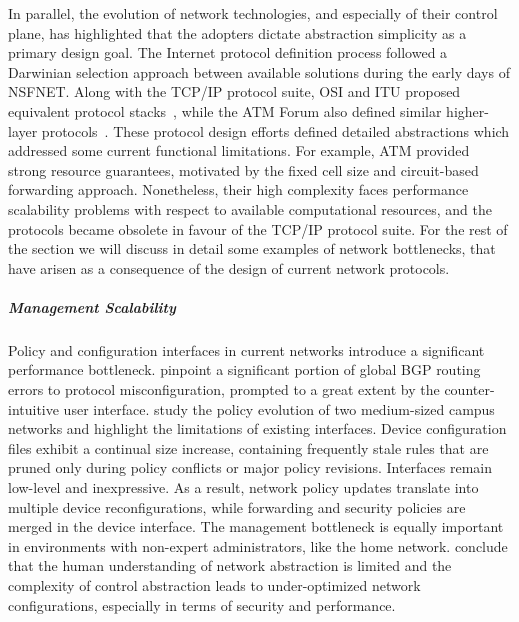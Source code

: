 In parallel, the evolution of network technologies, and especially of their
control plane, has highlighted that the adopters dictate abstraction
simplicity as a primary design goal. The Internet protocol definition process
followed a Darwinian selection approach between available solutions during the
early days of NSFNET\@. Along with the TCP/IP protocol suite, OSI and ITU
proposed equivalent protocol stacks~, while the ATM Forum
also defined similar higher-layer protocols~. These protocol
design efforts defined detailed abstractions which addressed some current
functional limitations.  For example, ATM provided strong resource guarantees,
motivated by the fixed cell size and circuit-based forwarding approach.
Nonetheless, their high complexity faces performance scalability problems with
respect to available computational resources, and the protocols became obsolete
in favour of the TCP/IP protocol suite. For the rest of the section we will
discuss in detail some examples of network bottlenecks, that have arisen as a
consequence of the design of current network protocols.

\subparagraph{Management Scalability}

Policy and configuration interfaces in current networks introduce a significant
performance bottleneck.   pinpoint a significant portion of
global BGP routing errors to protocol misconfiguration, prompted to a great
extent by the counter-intuitive user interface.   study
the policy evolution of two medium-sized campus networks and highlight
the limitations of existing interfaces.  Device configuration
files exhibit a continual size increase, containing frequently stale rules that
are pruned only during policy conflicts or major policy revisions.  Interfaces
remain low-level and inexpressive. As a result, network policy updates
translate into multiple device reconfigurations, while forwarding and security
policies are merged in the device interface. The management bottleneck is
equally important in environments with non-expert administrators, like the home
network.  conclude that the human understanding of network
abstraction is limited and the complexity of control abstraction leads to
under-optimized network configurations, especially  in terms of security and
performance. 


